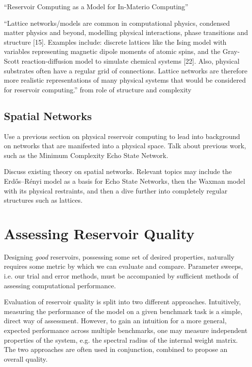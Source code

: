``Reservoir Computing as a Model for In-Materio Computing''

``Lattice networks/models are common in computational physics, condensed matter
physics and beyond, modelling physical interactions, phase transitions and
structure [15]. Examples include: discrete lattices like the Ising model with
variables representing magnetic dipole moments of atomic spins, and the Gray-
Scott reaction-diffusion model to simulate chemical systems [22]. Also, physical
substrates often have a regular grid of connections. Lattice networks are
therefore more realistic representations of many physical systems that would be
considered for reservoir computing.'' from role of structure and complexity

\subsection{Spatial Networks}

Use a previous section on physical reservoir computing to lead into background
on networks that are manifested into a physical space. Talk about previous work,
such as the Minimum Complexity Echo State Network.

Discuss existing theory on spatial networks. Relevant topics may include the
Erdős–Rényi model as a basis for Echo State Networks, then the Waxman model with
its physical restraints, and then a dive further into completely regular
structures such as lattices.

\section{Assessing Reservoir Quality}

Designing \textit{good} reservoirs, possessing some set of desired properties,
naturally requires some metric by which we can evaluate and compare. Parameter
sweeps, i.e. our trial and error methods, must be accompanied by sufficient
methods of assessing computational performance.

Evaluation of reservoir quality is split into two different
approaches. Intuitively, measuring the performance of the model on a given
benchmark task is a simple, direct way of assessment. However, to gain an
intuition for a more general, expected performance across multiple benchmarks,
one may measure independent properties of the system, e.g. the spectral radius
of the internal weight matrix. The two approaches are often used in conjunction,
combined to propose an overall quality.

